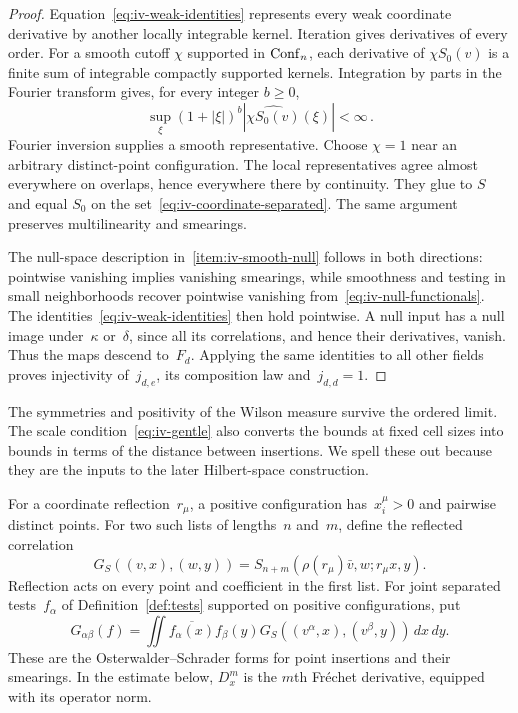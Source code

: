 \begin{proof}
Equation~\eqref{eq:iv-weak-identities} represents every weak coordinate derivative by another locally integrable kernel.
Iteration gives derivatives of every order.
For a smooth cutoff $\chi$ supported in $\operatorname{Conf}_{n}$, each derivative of $\chi S_0(v)$ is a finite sum of integrable compactly supported kernels.
Integration by parts in the Fourier transform gives, for every integer $b\ge0$,
\begin{equation*}
\sup_\xi(1+|\xi|)^b\left|\widehat{\chi S_0(v)}(\xi)\right|<\infty\,.
\end{equation*}
Fourier inversion supplies a smooth representative.
Choose $\chi=1$ near an arbitrary distinct-point configuration.
The local representatives agree almost everywhere on overlaps, hence everywhere there by continuity.
They glue to $S$ and equal $S_0$ on the set~\eqref{eq:iv-coordinate-separated}.
The same argument preserves multilinearity and smearings.

The null-space description in~\ref{item:iv-smooth-null} follows in both directions: pointwise vanishing implies vanishing smearings, while smoothness and testing in small neighborhoods recover pointwise vanishing from~\eqref{eq:iv-null-functionals}.
The identities~\eqref{eq:iv-weak-identities} then hold pointwise.
A null input has a null image under~$\kappa$ or~$\delta$, since all its correlations, and hence their derivatives, vanish.
Thus the maps descend to~$F_d$.
Applying the same identities to all other fields proves injectivity of~$j_{d,e}$, its composition law and~$j_{d,d}=1$.
\end{proof}

The symmetries and positivity of the Wilson measure survive the ordered limit.
The scale condition~\eqref{eq:iv-gentle} also converts the bounds at fixed cell sizes into bounds in terms of the distance between insertions.
We spell these out because they are the inputs to the later Hilbert-space construction.

For a coordinate reflection~$r_\mu$, a positive configuration has~$x_i^\mu>0$ and pairwise distinct points.
For two such lists of lengths~$n$ and~$m$, define the reflected correlation
\begin{equation}\label{eq:iv-os-form}
 G_S((v,x),(w,y))
 =S_{n+m}(\rho(r_\mu)\bar v,w;r_\mu x,y).
\end{equation}
Reflection acts on every point and coefficient in the first list.
For joint separated tests~$f_\alpha$ of Definition~\ref{def:tests} supported on positive configurations, put
\begin{equation}\label{eq:iv-os-smear}
 G_{\alpha\beta}(f)
 =\iint\overline{f_\alpha(x)}f_\beta(y)
 G_S((v^\alpha,x),(v^\beta,y))\,dx\,dy.
\end{equation}
These are the Osterwalder--Schrader forms for point insertions and their smearings.
In the estimate below, $D_x^m$ is the $m$th Fr\'echet derivative, equipped with its operator norm.

